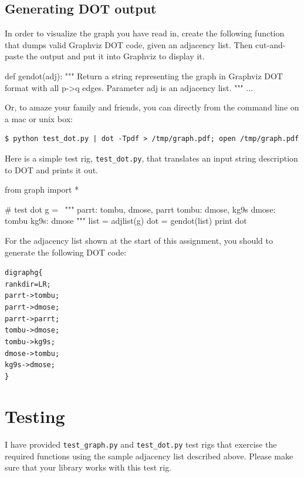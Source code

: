 \begin{fullwidth}
\subsection{Generating DOT output}

In order to visualize the graph you have read in, create the following function that dumps valid Graphviz DOT code, given an adjacency list. Then cut-and-paste the output and put it into Graphviz to display it.
 
\begin{pyverbatim}
def gendot(adj):
    """
    Return a string representing the graph in Graphviz DOT format
    with all p->q edges. Parameter adj is an adjacency list.
    """
    ...
\end{pyverbatim}

\noindent Or, to amaze your family and friends, you can directly from the command line on a mac or unix box:

\begin{lstlisting}[style=BashInputStyle]
$ python test_dot.py | dot -Tpdf > /tmp/graph.pdf; open /tmp/graph.pdf
\end{lstlisting}

Here is a simple test rig, {\tt test\_dot.py}, that translates an input string description to DOT and prints it out.

\begin{pyverbatim}
from graph import *

# test dot
g = \
"""
parrt: tombu, dmose, parrt
tombu: dmose, kg9s
dmose: tombu
kg9s: dmose
"""
list = adjlist(g)
dot = gendot(list)
print dot
\end{pyverbatim}

\noindent For the adjacency list shown at the start of this assignment, you should to generate the following DOT code:

\begin{alltt}\small
digraph g \{
  rankdir=LR;
  parrt -> tombu;
  parrt -> dmose;
  parrt -> parrt;
  tombu -> dmose;
  tombu -> kg9s;
  dmose -> tombu;
  kg9s -> dmose;
\}
\end{alltt}

\section{Testing}

I have provided {\tt test\_graph.py} and {\tt test\_dot.py}  test rigs that exercise the required functions using the sample adjacency list described above. Please make sure that your library works with this test rig.


\end{fullwidth}
